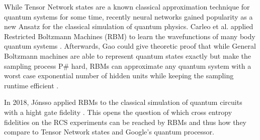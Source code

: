 While Tensor Network states are a known classical approximation technique for quantum systems for 
some time, recently neural networks gained popularity as a new Ansatz for the classical simulation
of quantum physics. Carleo et al. applied Restricted Boltzmann Machines (RBM) to learn the wavefunctions of many body 
quantum systems \cite{Carleo_2017}. Afterwards, Gao could give theoretic proof that while General 
Boltzmann machines are able to represent quantum states exactly but make the sampling process P\#
hard, RBMs can approximate any quantum system with a worst case exponential number of hidden units while keeping the 
sampling runtime efficient \cite{Gao_2017}.

In 2018, Jónsso applied RBMs to the classical simulation of 
quantum circuits with a hight gate fidelity \cite{jnsson2018neuralnetwork}. This opens the question of which 
cross entropy fidelities on the RCS experiments can be reached by RBMs and thus how they compare to 
Tensor Network states and Google's quantum processor.